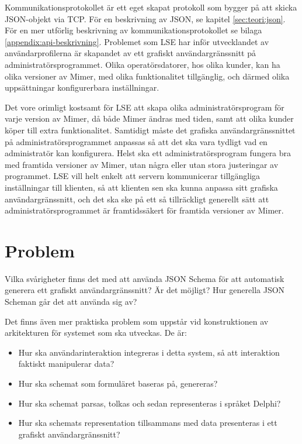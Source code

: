 Kommunikationsprotokollet är ett eget skapat protokoll som bygger på att skicka JSON-objekt via TCP. För en beskrivning av JSON, se kapitel \ref{sec:teori:json}. För en mer utförlig beskrivning av kommunikationsprotokollet se bilaga \ref{appendix:api-beskrivning}. Problemet som LSE har inför utvecklandet av användarprofilerna är skapandet av ett grafiskt användargränssnitt på administratörsprogrammet. Olika operatörsdatorer, hos olika kunder, kan ha olika versioner av Mimer, med olika funktionalitet tillgänglig, och därmed olika uppsättningar konfigurerbara inställningar.

Det vore orimligt kostsamt för LSE att skapa olika administratörsprogram för varje version av Mimer, då både Mimer ändras med tiden, samt att olika kunder köper till extra funktionalitet. Samtidigt måste det grafiska användargränssnittet på administratörsprogrammet anpassas så att det ska vara tydligt vad en administratör kan konfigurera. Helst ska ett administratörsprogram fungera bra med framtida versioner av Mimer, utan några eller utan stora justeringar av programmet. LSE vill helt enkelt att servern kommunicerar tillgängliga inställningar till klienten, så att klienten sen ska kunna anpassa sitt grafiska användargränssnitt, och det ska ske på ett så tillräckligt generellt sätt att administratörsprogrammet är framtidssäkert för framtida versioner av Mimer.

\section{Problem}
\label{sec:intro:problem}
Vilka svårigheter finns det med att använda JSON Schema för att automatisk generera ett grafiskt användargränssnitt? Är det möjligt? Hur generella JSON Scheman går det att använda sig av?

Det finns även mer praktiska problem som uppstår vid konstruktionen av arkitekturen för systemet som ska utveckas. De är:

\begin{itemize}
	\item Hur ska användarinteraktion integreras i detta system, så att interaktion faktiskt manipulerar data?
	\item Hur ska schemat som formuläret baseras på, genereras?
	\item Hur ska schemat parsas, tolkas och sedan representeras i språket Delphi?
	\item Hur ska schemats representation tillsammans med data presenteras i ett grafiskt användargränssnitt?
\end{itemize}

